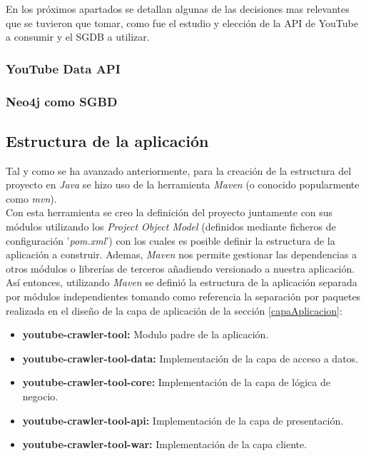 \documentclass[11pt,a4paper]{article}
\begin{document}
En los próximos apartados se detallan algunas de las decisiones mas relevantes que se tuvieron que tomar, como fue el estudio y elección de la API de YouTube a consumir y el SGDB a utilizar. 
\medskip

\subsubsection{YouTube Data API}\label{youTubeDataAPI} 
\medskip 

\subsubsection{Neo4j como SGBD}\label{sgbd} 
\medskip 

\subsection{Estructura de la aplicación}
Tal y como se ha avanzado anteriormente, para la creación de la estructura del proyecto en \textit{Java} se hizo uso de la herramienta \textit{Maven} (o conocido popularmente como \textit{mvn}).
\\

Con esta herramienta se creo la definición del proyecto juntamente con sus módulos utilizando los \textit{Project Object Model} (definidos mediante ficheros de configuración '\textit{pom.xml}') con los cuales es posible definir la estructura de la aplicación a construir. Ademas, \textit{Maven} nos permite gestionar las dependencias a otros módulos o librerías de terceros añadiendo versionado a nuestra aplicación.
\\

Así entonces, utilizando \textit{Maven} se definió la estructura de la aplicación separada por módulos independientes tomando como referencia la separación por paquetes realizada en el diseño de la capa de aplicación de la sección \ref{capaAplicacion}:

\begin{itemize}
\item \textbf{youtube-crawler-tool:} Modulo padre de la aplicación.
\item \textbf{youtube-crawler-tool-data:} Implementación de la capa de acceso a datos.
\item \textbf{youtube-crawler-tool-core:} Implementación de la capa de lógica de negocio.
\item \textbf{youtube-crawler-tool-api:} Implementación de la capa de presentación.
\item \textbf{youtube-crawler-tool-war:} Implementación de la capa cliente.
\end{itemize}
\end{document}
